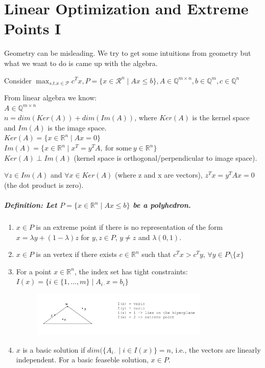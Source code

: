 \documentclass[main]{subfiles}
\begin{document}

\section{Linear Optimization and Extreme Points I}
Geometry can be misleading. We try to get some intuitions from geometry but
what we want to do is came up with the algebra.

Consider $\displaystyle \max_{s.t. x \in \mathcal{P}} c^{T}x, P = \{ x \in
\mathcal{R}^{n} \mid Ax \leq b \}, A \in \mathbb{Q}^{m \times n}, b \in
\mathbb{Q}^{m}, c \in \mathbb{Q}^{n}$

From linear algebra we know:\\
$A \in \mathbb{Q}^{m \times n}$\\
$n = dim(Ker(A)) + dim(Im(A))$, where $Ker(A)$ is the kernel space and $Im(A)$
is the image space.\\
$Ker(A) = \{ x \in \mathbb{R}^{n} \mid Ax = 0 \}$ \\
$Im(A) = \{ x \in \mathbb{R}^{n} \mid x^{T} = y^{T}A,\ \text{for some}\ y \in
\mathbb{R}^{n} \}$ \\
$Ker(A) \perp Im(A)$ (kernel space is orthogonal/perpendicular to image space).

$\forall z \in Im(A)$ and $\forall x \in Ker(A)$ (where z and x are vectors),
$z^{T}x = y^{T}Ax = 0$ (the dot product is zero).


\subparagraph{Definition: Let $P = \{ x \in \mathbb{R}^{n} \mid Ax \leq b \}$ be a polyhedron.}
\begin{enumerate}
\item $x \in P$ is an extreme point if there is no representation of the form
$x = \lambda y + (1- \lambda)z$ for $y, z \in P$, $y \neq z$ and $\lambda
(0,1)$.
\item $x \in P$ is an vertex if there exists $c \in \mathbb{R}^{n}$ such that
$c^{T}x > c^{T} y$, $\forall y \in P\setminus\{x\}$
\item For a point $x \in \mathbb{R}^{n}$, the index set has tight constraints:
$I(x) = \{i \in \{1, ..., m\} \mid A_{i \cdot}x = b_{i}\}$

\begin{figure}
  \label{fig:indexset}
  \centering
    \includegraphics[width=0.8\textwidth]{imgs/indexset.png}
\end{figure}

\item $x$ is a basic solution if $dim(\{A_{i\cdot} \mid i \in I(x)\} = n$,
i.e., the vectors are linearly independent. For a basic feaseble solution,
$x \in P$.
\end{enumerate}
\end{document}
